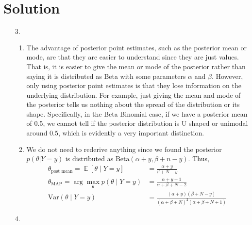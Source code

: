 \documentclass[submit]{../harvardml}
\newenvironment{answer}
  {\section*{Solution}}
{}
\DeclareMathOperator*{\mean}{\mathbb{E}}
\begin{document}
\begin{answer}
\begin{enumerate}
\begin{enumerate}
      \end{enumerate}

    \item[3.]

      \begin{enumerate}
        \item
        The advantage of posterior point estimates, such as the posterior mean or mode, are that they are easier to understand since they are just values. That is, it is easier to give the mean or mode of the posterior rather than saying it is distributed as Beta with some parameters $\alpha$ and $\beta$. However, only using posterior point estimates is that they lose information on the underlying distribution. For example, just giving the mean and mode of the posterior tells us nothing about the spread of the distribution or its shape. Specifically, in the Beta Binomial case, if we have a posterior mean of $0.5$, we cannot tell if the posterior distribution is U shaped or unimodal around $0.5$, which is evidently a very important distinction. 
        \item
            We do not need to rederive anything since we found the posterior $p(\theta | Y =y)$ is distributed as $\text{Beta}(\alpha + y, \beta + n -y)$. Thus,
              \begin{align*}
                \theta_{\text{post mean}} = \mean [\theta \mid Y = y]     & = \frac{\alpha + y}{\beta + N - y}\\
                \theta_{\text{MAP}} =\arg \max_{\theta}p(\theta \mid Y=y) & = \frac{\alpha + y - 1}{\alpha + \beta + N - 2}\\
                \mathrm{Var}(\theta \mid Y = y)                           & = \frac{(\alpha + y) (\beta + N -y )}{(\alpha + \beta + N)^2(\alpha + \beta + N + 1)}
              \end{align*}
        
      \end{enumerate}

    \item[4.]


\end{enumerate}
\end{answer}
\end{document}
